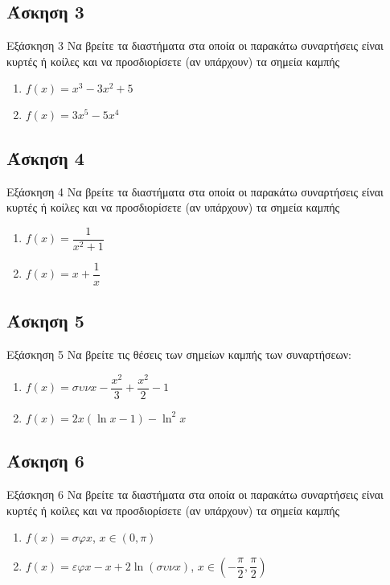 \documentclass[greek]{beamer}
\begin{document}
\subsection{Άσκηση 3}
\begin{frame}[label=Άσκηση3,t]{Εξάσκηση 3}
  Να βρείτε τα διαστήματα στα οποία οι παρακάτω συναρτήσεις είναι κυρτές ή κοίλες και να προσδιορίσετε (αν υπάρχουν) τα σημεία καμπής
  \begin{enumerate}
    \item<1-> $f(x)=x^3-3x^2+5$
    \item<2-> $f(x)=3x^5-5x^4$
  \end{enumerate}

\end{frame}

\subsection{Άσκηση 4}
\begin{frame}[label=Άσκηση4,t]{Εξάσκηση 4}
  Να βρείτε τα διαστήματα στα οποία οι παρακάτω συναρτήσεις είναι κυρτές ή κοίλες και να προσδιορίσετε (αν υπάρχουν) τα σημεία καμπής
  \begin{enumerate}
    \item<1-> $f(x)=\dfrac{1}{x^2+1}$
    \item<2-> $f(x)=x+\dfrac{1}{x}$
  \end{enumerate}

\end{frame}

\subsection{Άσκηση 5}
\begin{frame}[label=Άσκηση5,t]{Εξάσκηση 5}
  Να βρείτε τις θέσεις των σημείων καμπής των συναρτήσεων:
  \begin{enumerate}
    \item<1-> $f(x)=συνx-\dfrac{x^2}{3}+\dfrac{x^2}{2}-1$
    \item<2-> $f(x)=2x(\ln x-1)-\ln^2x$
  \end{enumerate}

\end{frame}

\subsection{Άσκηση 6}
\begin{frame}[label=Άσκηση6,t]{Εξάσκηση 6}
  Να βρείτε τα διαστήματα στα οποία οι παρακάτω συναρτήσεις είναι κυρτές ή κοίλες και να προσδιορίσετε (αν υπάρχουν) τα σημεία καμπής
  \begin{enumerate}
    \item<1-> $f(x)=σφx$, $x\in (0,\pi)$
    \item<2-> $f(x)=εφx-x+2\ln (συνx)$, $x\in (-\dfrac{\pi}{2},\dfrac{\pi}{2})$
  \end{enumerate}

\end{frame}
\end{document}
